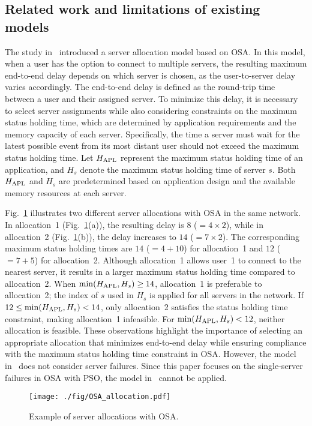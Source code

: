 \documentclass[conference]{IEEEtran}
\begin{document}
\begin{CJK}{UTF8}{ipxm}
\section{Related work and limitations of existing models}
\label{sec:related_work}

The study in~\cite{OSA_Kawabata_2021} introduced a server allocation model based on OSA. 
In this model, when a user has the option to connect to multiple servers, the resulting maximum end-to-end delay depends on which server is chosen, as the user-to-server delay varies accordingly. 
The end-to-end delay is defined as the round-trip time between a user and their assigned server. 
To minimize this delay, it is necessary to select server assignments while also considering constraints on the maximum status holding time, which are determined by application requirements and the memory capacity of each server. 
Specifically, the time a server must wait for the latest possible event from its most distant user should not exceed the maximum status holding time. 
Let $H_{\rm APL}$ represent the maximum status holding time of an application, and $H_s$ denote the maximum status holding time of server $s$. 
Both $H_{\rm APL}$ and $H_s$ are predetermined based on application design and the available memory resources at each server.

Fig.~\ref{fig:OSA_allocation} illustrates two different server allocations with OSA in the same network. 
In allocation~1 (Fig.~\ref{fig:OSA_allocation}(a)), the resulting delay is $8$ ($=4 \times 2$), while in allocation~2 (Fig.~\ref{fig:OSA_allocation}(b)), the delay increases to $14$ ($=7 \times 2$). 
The corresponding maximum status holding times are $14$ ($=4+10$) for allocation~1 and $12$ ($=7+5$) for allocation~2. 
Although allocation~1 allows user~1 to connect to the nearest server, it results in a larger maximum status holding time compared to allocation~2. 
When $\min(H_{\rm APL}, H_s) \geq 14$, allocation~1 is preferable to allocation~2; the index of $s$ used in $H_s$ is applied for all servers in the network.
If $12 \leq \min(H_{\rm APL}, H_s) < 14$, only allocation~2 satisfies the status holding time constraint, making allocation~1 infeasible. 
For $\min(H_{\rm APL}, H_s) < 12$, neither allocation is feasible. 
These observations highlight the importance of selecting an appropriate allocation that minimizes end-to-end delay while ensuring compliance with the maximum status holding time constraint in OSA.
However, the model in~\cite{OSA_Kawabata_2021} does not consider server failures.
Since this paper focuses on the single-server failures in OSA with PSO, the model in~\cite{OSA_Kawabata_2021} cannot be applied.
\begin{figure}[tb]
  \begin{center}
      \texttt{[image: ./fig/OSA\_allocation.pdf]}
  \end{center}
    \vspace{-0.4cm}
  \caption{Example of server allocations with OSA.}
  \label{fig:OSA_allocation}
\end{figure}


\end{CJK}
\end{document}
